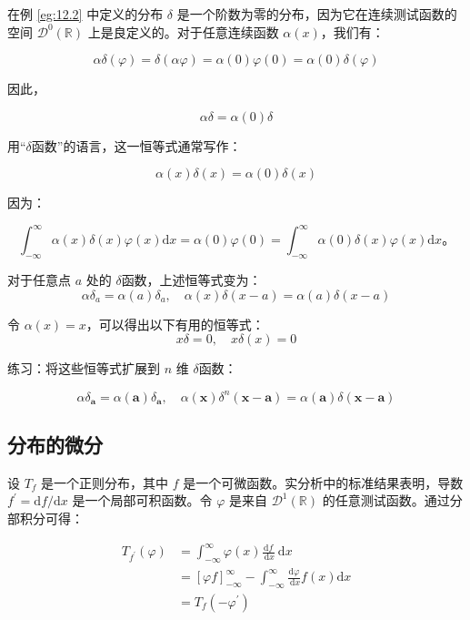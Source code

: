 \begin{eg}\label{eg:12.3}
在例 \ref{eg:12.2} 中定义的分布 $\delta$
是一个阶数为零的分布，因为它在连续测试函数的空间
$\mathcal{D}^0(\mathbb{R})$ 上是良定义的。对于任意连续函数
$\alpha(x)$，我们有：

$$
\alpha \delta(\varphi) = \delta(\alpha \varphi) = \alpha(0) \varphi(0) = \alpha(0) \delta(\varphi)
$$

因此，

\begin{equation}
  \alpha \delta = \alpha(0) \delta
\end{equation}

用``$\delta$函数''的语言，这一恒等式通常写作：

$$
\alpha(x) \delta(x) = \alpha(0) \delta(x)
$$

因为：

$$
\int_{-\infty}^\infty \alpha(x) \delta(x) \varphi(x) \mathrm{d}x = \alpha(0) \varphi(0) = \int_{-\infty}^\infty \alpha(0) \delta(x) \varphi(x) \mathrm{d}x。
$$

对于任意点 $a$ 处的 $\delta$函数，上述恒等式变为：
\begin{equation}
  \alpha \delta_a = \alpha(a) \delta_a, \quad \alpha(x) \delta(x-a) = \alpha(a) \delta(x-a)
\end{equation}


令 $\alpha(x) = x$，可以得出以下有用的恒等式：
\begin{equation}
  x \delta = 0, \quad x \delta(x) = 0
\end{equation}

\end{eg}
\begin{exercise}
  练习：将这些恒等式扩展到 $n$ 维 $\delta$函数：

$$
\alpha \delta_{\mathbf{a}} = \alpha(\mathbf{a}) \delta_{\mathbf{a}}, \quad \alpha(\mathbf{x}) \delta^n(\mathbf{x} - \mathbf{a}) = \alpha(\mathbf{a}) \delta(\mathbf{x} - \mathbf{a})
$$
\end{exercise}

\subsection{分布的微分}

设 $T_f$ 是一个正则分布，其中 $f$
是一个可微函数。实分析中的标准结果表明，导数
$f^{\prime} = \mathrm{d}f / \mathrm{d}x$ 是一个局部可积函数。令
$\varphi$ 是来自 $\mathcal{D}^1(\mathbb{R})$
的任意测试函数。通过分部积分可得：

$$
\begin{aligned}
T_{f^{\prime}}(\varphi) & = \int_{-\infty}^\infty \varphi(x) \frac{\mathrm{d}f}{\mathrm{~d}x} \mathrm{~d}x \\
& = [\varphi f]_{-\infty}^\infty - \int_{-\infty}^\infty \frac{\mathrm{d}\varphi}{\mathrm{~d}x} f(x) \mathrm{d}x \\
& = T_f\left(-\varphi^{\prime}\right)
\end{aligned}
$$

